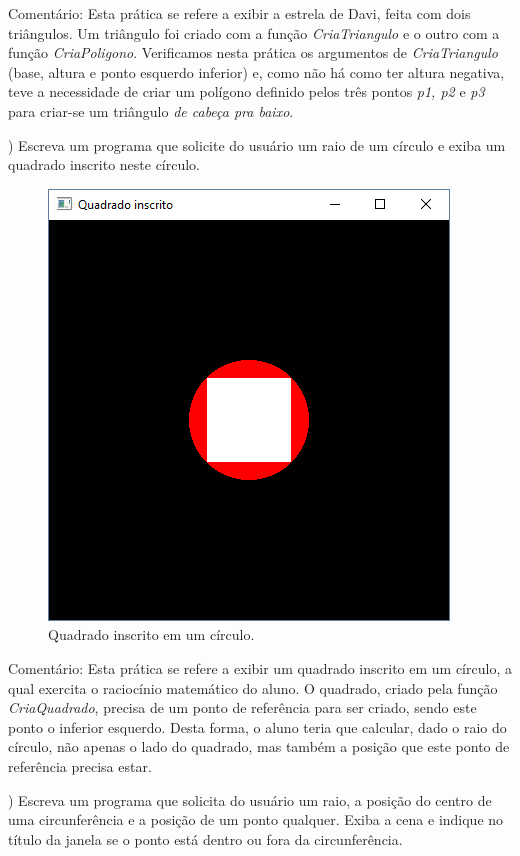 \begin{renumerate}
  Comentário: Esta prática se refere a exibir a estrela de Davi, feita com dois triângulos. Um triângulo foi criado com a função \emph{CriaTriangulo} e o outro com a função \emph{CriaPoligono}. Verificamos nesta prática os argumentos de \emph{CriaTriangulo} (base, altura e ponto esquerdo inferior) e, como não há como ter altura negativa, teve a necessidade de criar um polígono definido pelos três pontos \emph{p1, p2} e \emph{p3} para criar-se um triângulo \emph{de cabeça pra baixo}.
%

  \item)
  Escreva um programa que solicite do usuário um raio de um círculo e exiba um quadrado inscrito neste círculo.
  \label{ex:cap01_ex8}

  \begin{figure}[H]
    \centerline{\includegraphics[width=.3\textwidth]{img/cap1_ex21}}
    \caption{Quadrado inscrito em um círculo.}
    \label{fig:cap01_ex8}
  \end{figure}

  Comentário: Esta prática se refere a exibir um quadrado inscrito em um círculo, a qual exercita o raciocínio matemático do aluno. O quadrado, criado pela função \emph{CriaQuadrado}, precisa de um ponto de referência para ser criado, sendo este ponto o inferior esquerdo. Desta forma, o aluno teria que calcular, dado o raio do círculo, não apenas o lado do quadrado, mas também a posição que este ponto de referência precisa estar.

%


  \item)
  Escreva um programa que solicita do usuário um raio, a posição do centro de uma circunferência e a posição de um ponto qualquer. Exiba a cena e indique no título da janela se o ponto está dentro ou fora da circunferência.


\end{renumerate}

